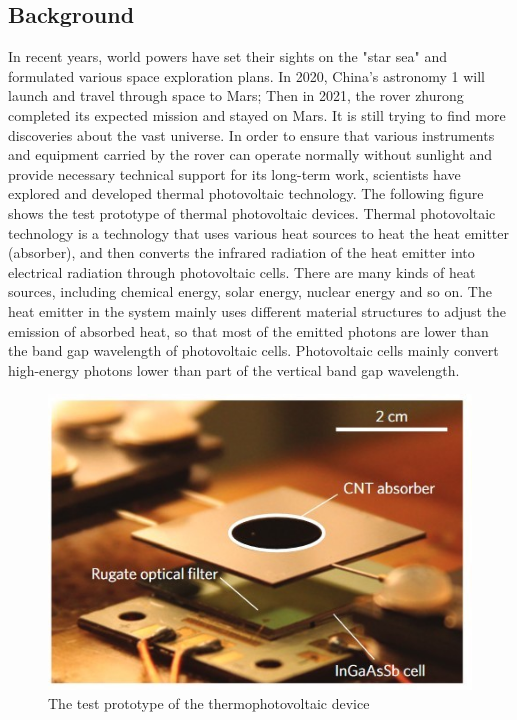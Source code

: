 \documentclass{apmcmthesis}
\begin{document}
\subsection{Background}
\hspace{2em}In recent years, world powers have set their sights on the "star sea" and formulated various space exploration plans. In 2020, China's astronomy 1 will launch and travel through space to Mars; Then in 2021, the rover zhurong completed its expected mission and stayed on Mars. It is still trying to find more discoveries about the vast universe. In order to ensure that various instruments and equipment carried by the rover can operate normally without sunlight and provide necessary technical support for its long-term work, scientists have explored and developed thermal photovoltaic technology. The following figure shows the test prototype of thermal photovoltaic devices. Thermal photovoltaic technology is a technology that uses various heat sources to heat the heat emitter (absorber), and then converts the infrared radiation of the heat emitter into electrical radiation through photovoltaic cells. There are many kinds of heat sources, including chemical energy, solar energy, nuclear energy and so on. The heat emitter in the system mainly uses different material structures to adjust the emission of absorbed heat, so that most of the emitted photons are lower than the band gap wavelength of photovoltaic cells. Photovoltaic cells mainly convert high-energy photons lower than part of the vertical band gap wavelength.\par

\begin{figure}[ht]
\centering
\includegraphics[scale=0.6]{figures/3.jpg}
\caption{The test prototype of the thermophotovoltaic device}
\label{fig:pathdemo}
\end{figure}
\end{document}
